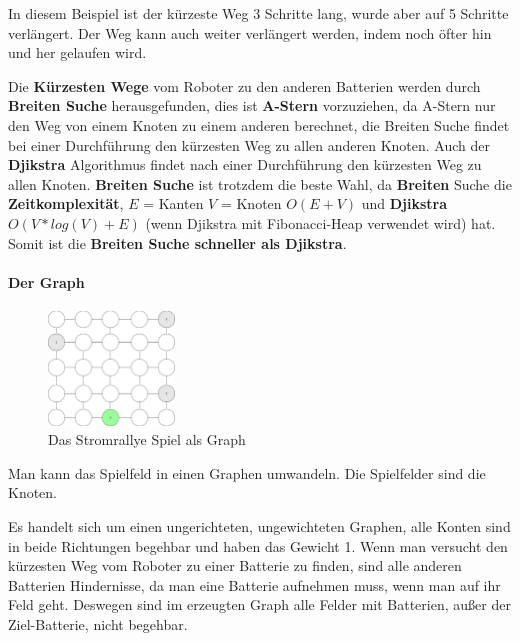 \documentclass[a4paper,12pt,arial]{scrartcl}
\begin{document}
In diesem Beispiel ist der kürzeste Weg 3 Schritte lang, wurde aber auf 5 Schritte verlängert. Der Weg kann auch weiter verlängert werden, indem noch öfter hin und her gelaufen wird.

\par
Die \textbf{Kürzesten Wege} vom Roboter zu den anderen Batterien werden durch \textbf{Breiten Suche} \cite{cormen} herausgefunden, dies ist \textbf{A-Stern} \cite{hart} vorzuziehen, da A-Stern nur den Weg von einem Knoten zu einem anderen berechnet, die Breiten Suche findet bei einer Durchführung den kürzesten Weg zu allen anderen Knoten. Auch der \textbf{Djikstra} \cite{dijkstra} Algorithmus findet nach einer Durchführung den kürzesten Weg zu allen Knoten. \textbf{Breiten Suche} ist trotzdem die beste Wahl, da \textbf{Breiten} Suche die \textbf{Zeitkomplexität}, $E$ = Kanten $V$ = Knoten $O(E + V)$ und \textbf{Djikstra} $O(V * log(V) + E)$ (wenn Djikstra mit Fibonacci-Heap verwendet wird) hat. Somit ist die \textbf{Breiten Suche schneller als Djikstra}.

\paragraph{Der Graph}
\captionsetup[figure]{name=Abb.}
\begin{figure}
    \includegraphics[width=0.3\textwidth]{graph_stromrallye.pdf}
    \caption{Das Stromrallye Spiel als Graph}
    \label{fig:graph_stromrallye}
    \vspace{-5pt}
\end{figure}
\captionsetup[figure]{name=Abbildung}
Man kann das Spielfeld in einen Graphen umwandeln. Die Spielfelder sind die Knoten.


Es handelt sich um einen ungerichteten, ungewichteten Graphen, alle Konten sind in beide Richtungen begehbar und haben das Gewicht 1.
Wenn man versucht den kürzesten Weg vom Roboter zu einer Batterie zu finden, sind alle anderen Batterien Hindernisse, da man eine Batterie aufnehmen muss, wenn man auf ihr Feld geht. Deswegen sind im erzeugten Graph alle Felder mit Batterien, außer der Ziel-Batterie, nicht begehbar.
\end{document}

